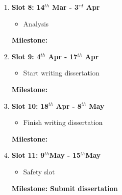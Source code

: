\begin{enumerate}
\begin{itemize}
		\item Catch-up time or extensions
	\end{itemize}
	{\bf Milestone:} 
\item {\bf Slot 8: 14$^{th}$ Mar - 3$^{rd}$ Apr}
	\begin{itemize}
		\item Analysis
	\end{itemize}
	{\bf Milestone:} 
\item {\bf Slot 9: 4$^{th}$ Apr - 17$^{th}$ Apr}
	\begin{itemize}
		\item Start writing dissertation
	\end{itemize}
	{\bf Milestone:}
\item {\bf Slot 10: 18$^{th}$ Apr - 8$^{th}$ May}
	\begin{itemize}
		\item Finish writing dissertation
	\end{itemize}
	{\bf Milestone:}	 
\item {\bf Slot 11: 9$^{th}$May  - 15$^{th}$May}
	\begin{itemize}
		\item Safety slot
	\end{itemize}
	{\bf Milestone: Submit dissertation} 
\end{enumerate}



 

